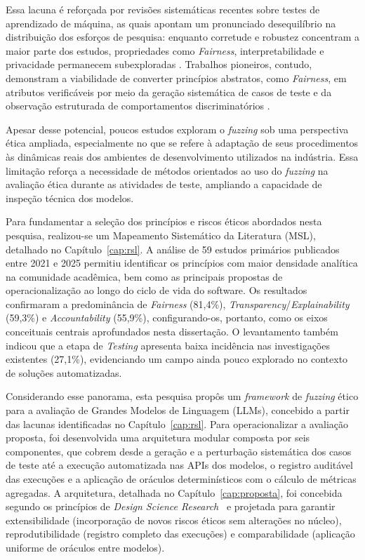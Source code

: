 Essa lacuna é reforçada por revisões sistemáticas recentes sobre testes de aprendizado de máquina, as quais apontam um pronunciado desequilíbrio na distribuição dos esforços de pesquisa: enquanto corretude e robustez concentram a maior parte dos estudos, propriedades como \textit{Fairness}, interpretabilidade e privacidade permanecem subexploradas \cite{Zhang2022}. Trabalhos pioneiros, contudo, demonstram a viabilidade de converter princípios abstratos, como \textit{Fairness}, em atributos verificáveis por meio da geração sistemática de casos de teste e da observação estruturada de comportamentos discriminatórios \cite{Galhotra2017, Udeshi2018}.

Apesar desse potencial, poucos estudos exploram o \textit{fuzzing} sob uma perspectiva ética ampliada, especialmente no que se refere à adaptação de seus procedimentos às dinâmicas reais dos ambientes de desenvolvimento utilizados na indústria. Essa limitação reforça a necessidade de métodos orientados ao uso do \textit{fuzzing} na avaliação ética durante as atividades de teste, ampliando a capacidade de inspeção técnica dos modelos.

Para fundamentar a seleção dos princípios e riscos éticos abordados nesta pesquisa, realizou-se um Mapeamento Sistemático da Literatura (MSL), detalhado no Capítulo~\ref{cap:rsl}. A análise de 59 estudos primários publicados entre 2021 e 2025 permitiu identificar os princípios com maior densidade analítica na comunidade acadêmica, bem como as principais propostas de operacionalização ao longo do ciclo de vida do software. Os resultados confirmaram a predominância de \textit{Fairness} (81,4\%), \textit{Transparency}/\textit{Explainability} (59,3\%) e \textit{Accountability} (55,9\%), configurando-os, portanto, como os eixos conceituais centrais aprofundados nesta dissertação. O levantamento também indicou que a etapa de \textit{Testing} apresenta baixa incidência nas investigações existentes (27,1\%), evidenciando um campo ainda pouco explorado no contexto de soluções automatizadas.

Considerando esse panorama, esta pesquisa propôs um \textit{framework} de \textit{fuzzing} ético para a avaliação de Grandes Modelos de Linguagem (LLMs), concebido a partir das lacunas identificadas no Capítulo~\ref{cap:rsl}. Para operacionalizar a avaliação proposta, foi desenvolvida uma arquitetura modular composta por seis componentes, que cobrem desde a geração e a perturbação sistemática dos casos de teste até a execução automatizada nas APIs dos modelos, o registro auditável das execuções e a aplicação de oráculos determinísticos com o cálculo de métricas agregadas. A arquitetura, detalhada no Capítulo~\ref{cap:proposta}, foi concebida segundo os princípios de \textit{Design Science Research}~\cite{Hevner2004} e projetada para garantir extensibilidade (incorporação de novos riscos éticos sem alterações no núcleo), reprodutibilidade (registro completo das execuções) e comparabilidade (aplicação uniforme de oráculos entre modelos).

